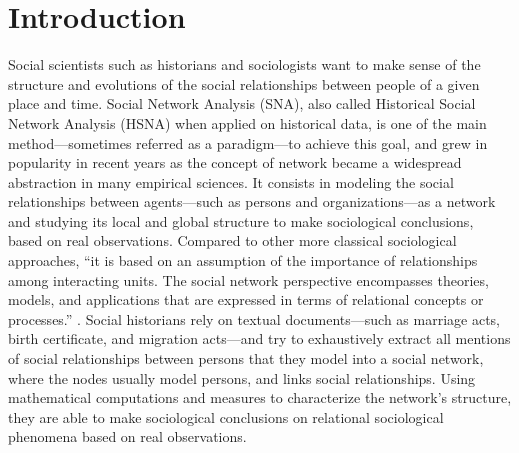 


\chapter{Introduction}

Social scientists such as historians and sociologists want to make sense of the structure and evolutions of the social relationships between people of a given place and time.
Social Network Analysis (SNA), also called  Historical Social Network Analysis (HSNA) when applied on historical data, is one of the main method---sometimes referred as a paradigm---to achieve this goal, and grew in popularity in recent years as the concept of network became a widespread abstraction in many empirical sciences.
It consists in modeling the social relationships between agents---such as persons and organizations---as a network and studying its local and global structure to make sociological conclusions, based on real observations.
Compared to other more classical sociological approaches, ``it is based on an assumption of the importance of relationships among interacting units.
The social network perspective encompasses theories, models, and applications that are expressed in terms of relational concepts or processes.'' \cite{wassermanSocialNetworkAnalysis1994}.
Social historians rely on textual documents---such as marriage acts, birth certificate, and migration acts---and try to exhaustively extract all mentions of social relationships between persons that they model into a social network, where the nodes usually model persons, and links social relationships.
Using mathematical computations and measures to characterize the network's structure, they are able to make sociological conclusions on relational sociological phenomena based on real observations.

